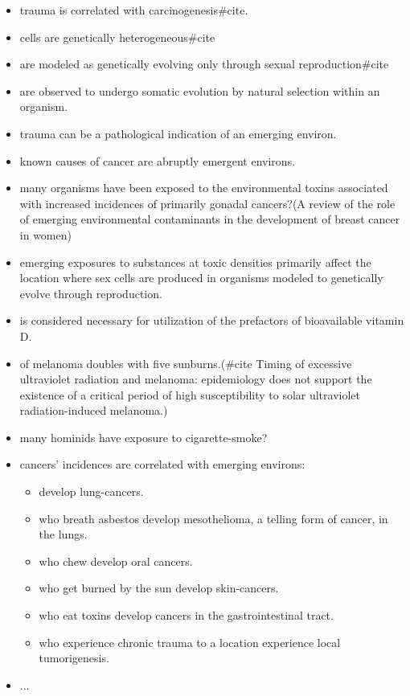 \begin{itemize}
  \item trauma is correlated with carcinogenesis\#cite.
  \item cells are genetically heterogeneous\#cite
  \item are modeled as genetically evolving only through sexual reproduction\#cite
  \item are observed to undergo somatic evolution by natural selection within an organism.
  \item trauma can be a pathological indication of an emerging environ.
  \item known causes of cancer are abruptly emergent environs.
  \item many organisms have been exposed to the environmental toxins associated with increased incidences of primarily gonadal cancers?(A review of the role of emerging environmental contaminants in the development of breast cancer in women)
  \item emerging exposures to substances at toxic densities primarily affect the location where sex cells are produced in organisms modeled to genetically evolve through reproduction.
  \item is considered necessary for utilization of the prefactors of bioavailable vitamin D.
  \item of melanoma doubles with five sunburns.(\#cite Timing of excessive ultraviolet radiation and melanoma: epidemiology does not support the existence of a critical period of high susceptibility to solar ultraviolet radiation-induced melanoma.)
  \item many hominids have exposure to cigarette-smoke?
  \item cancers' incidences are correlated with emerging environs:
    \begin{itemize}
      \item develop lung-cancers.
      \item who breath asbestos develop mesothelioma, a telling form of cancer, in the lungs.
      \item who chew develop oral cancers.
      \item who get burned by the sun develop skin-cancers.
      \item who eat toxins develop cancers in the gastrointestinal tract.
      \item who experience chronic trauma to a location experience local tumorigenesis.
    \end{itemize}
  \item ...
\end{itemize}


